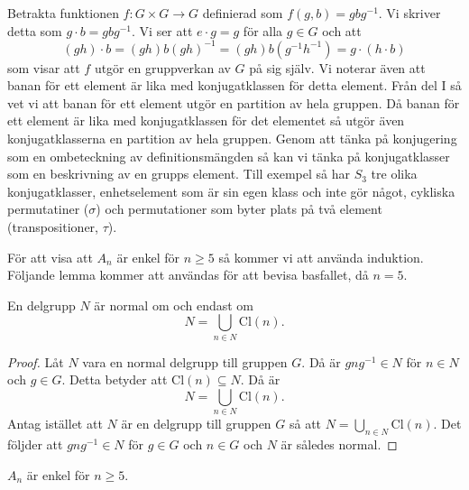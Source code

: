 \documentclass{article}
\theoremstyle{definition}
\begin{document}
Betrakta funktionen $f: G \times G \rightarrow G$ definierad som $f(g, b) = gbg^{-1}$.
Vi skriver detta som $g \cdot b = gbg^{-1}$. Vi ser att $e \cdot g = g$ för alla $g \in G$ och att 
\[ (gh) \cdot b = (gh)b(gh)^{-1} = (gh)b(g^{-1}h^{-1}) = g \cdot (h \cdot b) \]
som visar att $f$ utgör en gruppverkan av $G$ på sig själv. Vi noterar även att 
banan för ett element är lika med konjugatklassen för detta element. 
Från del I så vet vi att banan för ett element utgör en partition av hela gruppen. Då banan för ett 
element är lika med konjugatklassen för det elementet så utgör även konjugatklasserna en partition av hela gruppen. 
Genom att tänka på konjugering som en ombeteckning av definitionsmängden så kan vi tänka på konjugatklasser 
som en beskrivning av en grupps element. 
Till exempel så har $S_3$ tre olika konjugatklasser, enhetselement som är sin egen klass 
och inte gör något, cykliska permutatiner ($\sigma$) och permutationer som byter plats på två element (transpositioner, $\tau$).

För att visa att $A_n$ är enkel för $n \geq 5$ så kommer vi att använda induktion. 
Följande lemma kommer att användas för att bevisa basfallet, då $n = 5$.

\hypertarget{lemma3.2.3}{}
\begin{mylemma}{}{}
  En delgrupp $N$ är normal om och endast om 
  \[ N = \bigcup_{n \in N} \text{Cl}(n). \]
\end{mylemma}

\begin{proof}
  Låt $N$ vara en normal delgrupp till gruppen $G$. Då är $gng^{-1} \in N$ för $n \in N$ och $g \in G$. Detta betyder att 
  $\text{Cl}(n) \subseteq N$. Då är 
  \[N = \bigcup_{n \in N} \text{Cl}(n).\]
  Antag istället att $N$ är en delgrupp till gruppen $G$ så att $N = \bigcup_{n \in N} \text{Cl}(n)$. Det följder att 
  $gng^{-1} \in N$ för $g \in G$ och $n \in G$ och $N$ är således normal.
\end{proof}

\hypertarget{sats3.2.4}{}
\begin{mytheo}{}{}
  $A_n$ är enkel för $n \geq 5$.
\end{mytheo}
\end{document}
